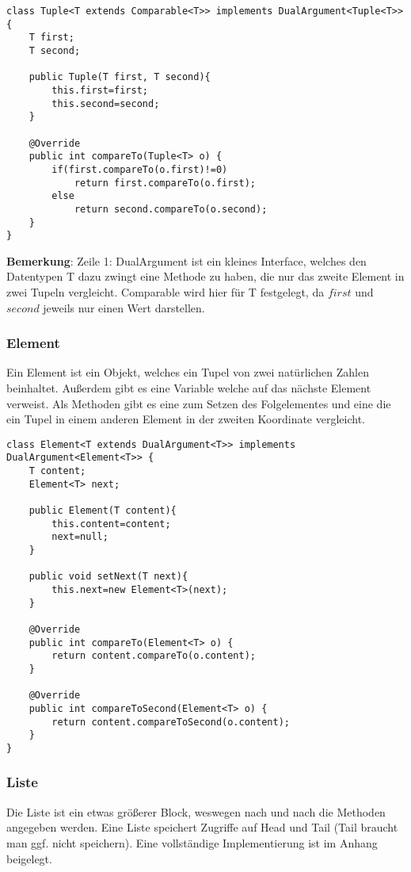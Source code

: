 \begin{lstlisting}[mathescape]
class Tuple<T extends Comparable<T>> implements DualArgument<Tuple<T>>{
    T first;
    T second;

    public Tuple(T first, T second){
        this.first=first;
        this.second=second;
    }

    @Override
    public int compareTo(Tuple<T> o) {
        if(first.compareTo(o.first)!=0)
            return first.compareTo(o.first);
        else
            return second.compareTo(o.second);
    }
}
 \end{lstlisting}
 
\textbf{Bemerkung}: Zeile 1: DualArgument ist ein kleines Interface, welches den Datentypen T dazu zwingt eine Methode zu haben, die nur das zweite Element in zwei Tupeln vergleicht. Comparable wird hier für T festgelegt, da $first$ und $second$ jeweils nur einen Wert darstellen.

\subsubsection*{Element}
Ein Element ist ein Objekt, welches ein Tupel von zwei natürlichen Zahlen beinhaltet. Außerdem gibt es eine Variable welche auf das nächste Element verweist. Als Methoden gibt es eine zum Setzen des Folgelementes und eine die ein Tupel in einem anderen Element in der zweiten Koordinate vergleicht.\newpage

\begin{lstlisting}[mathescape]
class Element<T extends DualArgument<T>> implements DualArgument<Element<T>> {
    T content;
    Element<T> next;

    public Element(T content){
        this.content=content;
        next=null;
    }

    public void setNext(T next){
        this.next=new Element<T>(next);
    }

    @Override
    public int compareTo(Element<T> o) {
        return content.compareTo(o.content);
    }

    @Override
    public int compareToSecond(Element<T> o) {
        return content.compareToSecond(o.content);
    }
}
\end{lstlisting}





 

\subsubsection*{Liste}
Die Liste ist ein etwas größerer Block, weswegen nach und nach die Methoden angegeben werden. Eine Liste speichert Zugriffe auf Head und Tail (Tail braucht man ggf. nicht speichern). Eine vollständige Implementierung ist im Anhang beigelegt.

